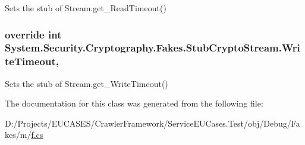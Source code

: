 Sets the stub of Stream.\-get\-\_\-\-Read\-Timeout()

\hypertarget{class_system_1_1_security_1_1_cryptography_1_1_fakes_1_1_stub_crypto_stream_ae3205a8e92a937dc4142067089f2f108}{
\subsubsection[{Write\-Timeout}]{\setlength{\rightskip}{0pt plus 5cm}override int System.\-Security.\-Cryptography.\-Fakes.\-Stub\-Crypto\-Stream.\-Write\-Timeout\hspace{0.3cm}{\ttfamily [get]}, {\ttfamily [set]}}}\label{class_system_1_1_security_1_1_cryptography_1_1_fakes_1_1_stub_crypto_stream_ae3205a8e92a937dc4142067089f2f108}


Sets the stub of Stream.\-get\-\_\-\-Write\-Timeout()



The documentation for this class was generated from the following file\-:\begin{DoxyCompactItemize}
\item 
D\-:/\-Projects/\-E\-U\-C\-A\-S\-E\-S/\-Crawler\-Framework/\-Service\-E\-U\-Cases.\-Test/obj/\-Debug/\-Fakes/m/\hyperlink{m_2f_8cs}{f.\-cs}\end{DoxyCompactItemize}
